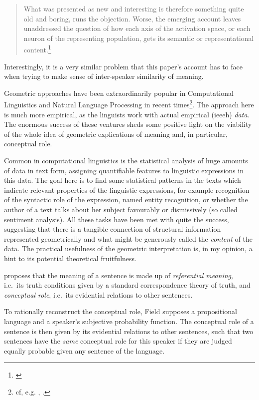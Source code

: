 \documentclass[11pt, a4paper]{scrartcl}
\renewcommand{\i}[1]{\emph{#1}}
\begin{document}
\begin{quote}\singlespacing{} What was presented as new and interesting is therefore something quite old and boring, runs the objection. Worse, the emerging account leaves unaddressed the question of how each axis of the activation space, or each neuron of the representing population, gets its semantic or representational content.\footnote{\textcite[7]{10.2307/2564566}}
 \end{quote}

 Interestingly, it is a very similar problem that this paper's account has to face when trying to make sense of inter-speaker similarity of meaning.

Geometric approaches have been extraordinarily popular in Computational Linguistics and Natural Language Processing in recent times\footnote{cf, e.g. \textcite{erk2008structured}, \textcite{sahlgren2006word}.}. The approach here is much more empirical, as the linguists work with actual empirical (ieeeh) \i{data}. The enormous success of these ventures sheds some positive light on the viability of the whole idea of geometric explications of meaning and, in particular, conceptual role.

Common in computational linguistics is the statistical analysis of huge amounts of data in text form, assigning quantifiable features to linguistic expressions in this data. The goal here is to find some statistical patterns in the texts which indicate relevant properties of the linguistic expressions, for example recognition of the syntactic role of the expression, named entity recognition, or whether the author of a text talks about her subject favourably or dismissively (so called sentiment analysis). All these tasks have been met with quite the success, suggesting that there is a tangible connection of structural information represented geometrically and what might be generously called the \i{content} of the data. The practical usefulness of the geometric interpretation is, in my opinion, a hint to its potential theoretical fruitfulness. 

\textcite{Field1977} proposes that the meaning of a sentence is made up of \i{referential meaning}, i.e.\ its truth conditions given by a standard correspondence theory of truth, and \i{conceptual role}, i.e.\ its evidential relations to other sentences.

To rationally reconstruct the conceptual role, Field supposes a propositional language and a speaker's subjective probability function. The conceptual role of a sentence is then given by its evidential relations to other sentences, such that two sentences have the \i{same} conceptual role for this speaker if they are judged equally probable given any sentence of the language. 
\end{document}
